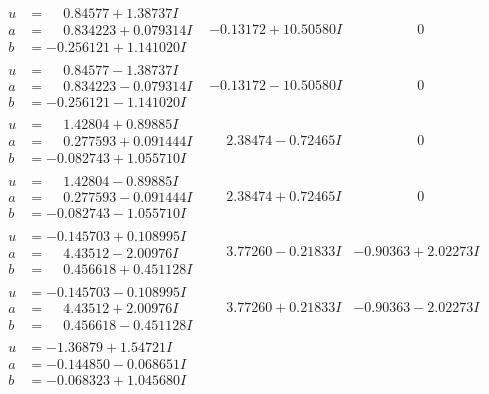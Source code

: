 \documentclass[1p]{elsarticle_modified}
\theoremstyle{definition}
\begin{document}
$$\begin{array}{c|c|c}
\begin{aligned}
u &= \phantom{-}0.84577 + 1.38737 I \\
a &= \phantom{-}0.834223 + 0.079314 I \\
b &= -0.256121 + 1.141020 I\end{aligned}
 & -0.13172 + 10.50580 I & \phantom{-0.000000 } 0 \\ \hline\begin{aligned}
u &= \phantom{-}0.84577 - 1.38737 I \\
a &= \phantom{-}0.834223 - 0.079314 I \\
b &= -0.256121 - 1.141020 I\end{aligned}
 & -0.13172 - 10.50580 I & \phantom{-0.000000 } 0 \\ \hline\begin{aligned}
u &= \phantom{-}1.42804 + 0.89885 I \\
a &= \phantom{-}0.277593 + 0.091444 I \\
b &= -0.082743 + 1.055710 I\end{aligned}
 & \phantom{-}2.38474 - 0.72465 I & \phantom{-0.000000 } 0 \\ \hline\begin{aligned}
u &= \phantom{-}1.42804 - 0.89885 I \\
a &= \phantom{-}0.277593 - 0.091444 I \\
b &= -0.082743 - 1.055710 I\end{aligned}
 & \phantom{-}2.38474 + 0.72465 I & \phantom{-0.000000 } 0 \\ \hline\begin{aligned}
u &= -0.145703 + 0.108995 I \\
a &= \phantom{-}4.43512 - 2.00976 I \\
b &= \phantom{-}0.456618 + 0.451128 I\end{aligned}
 & \phantom{-}3.77260 - 0.21833 I & -0.90363 + 2.02273 I \\ \hline\begin{aligned}
u &= -0.145703 - 0.108995 I \\
a &= \phantom{-}4.43512 + 2.00976 I \\
b &= \phantom{-}0.456618 - 0.451128 I\end{aligned}
 & \phantom{-}3.77260 + 0.21833 I & -0.90363 - 2.02273 I \\ \hline\begin{aligned}
u &= -1.36879 + 1.54721 I \\
a &= -0.144850 - 0.068651 I \\
b &= -0.068323 + 1.045680 I\end{aligned}

\end{array}$$
\end{document}
